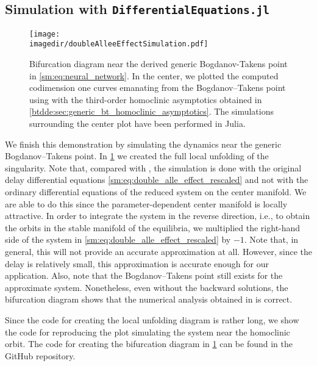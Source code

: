 \subsection{Simulation with {\tt DifferentialEquations.jl}}
%
\begin{figure}[ht!]
    \centering
    \texttt{[image: \\imagedir/doubleAlleeEffectSimulation.pdf]}
    \caption{Bifurcation diagram near the derived generic Bogdanov-Takens
        point in \cref{sm:eq:neural_network}. In the center, we plotted the
        computed codimension one curves emanating from the Bogdanov--Takens
        point using \DDEBIFTOOL with the third-order homoclinic asymptotics
        obtained in \cref{btdde:sec:generic_bt_homoclinic_asymptotics}. The simulations
        surrounding the center plot have been performed in Julia.}
    \label{sm:fig:double_alle_effect-bifurcation-diagram}
\end{figure}
%
We finish this demonstration by simulating the dynamics near the generic
Bogdanov--Takens point. In \cref{sm:fig:double_alle_effect-bifurcation-diagram}
we created the full local unfolding of the singularity. Note
that, compared with \cite{Jiao2021}, the simulation is done with the original
delay differential equations \cref{sm:eq:double_alle_effect_rescaled} and not
with the ordinary differential equations of the reduced system on the center
manifold. We are able to do this since the parameter-dependent center manifold
is locally attractive. In order to integrate the system in the reverse direction, i.e.,
to obtain the orbits in the stable manifold of the equilibria, we multiplied 
the right-hand side of the system in \cref{sm:eq:double_alle_effect_rescaled} by $-1$.
Note that, in general, this will not provide an accurate approximation at all.
However, since the delay is relatively small, this approximation is accurate
enough for our application. Also, note that the Bogdanov--Takens point still
exists for the approximate system. Nonetheless, even without the backward solutions,
the bifurcation diagram shows that the numerical analysis obtained in
\DDEBIFTOOL is correct.

Since the code for creating the local unfolding diagram is
rather long, we show the code for reproducing the plot simulating the system
near the homoclinic orbit. The code for creating the bifurcation diagram in
\cref{sm:fig:double_alle_effect-bifurcation-diagram} can be found in the
GitHub repository.

